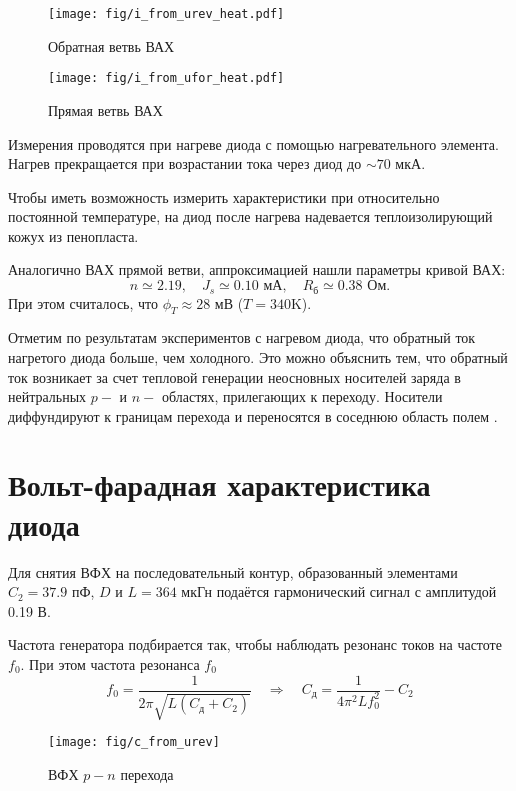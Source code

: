 \documentclass[a4paper,14pt]{extarticle}
\begin{document}
\begin{figure}[H]
	\centering
	\texttt{[image: fig/i\_from\_urev\_heat.pdf]}
	\vspace{-1em}
	\caption{Обратная ветвь ВАХ}
	\label{fig:vax2obr}
\end{figure}
\begin{figure}[H]
	\centering
	\texttt{[image: fig/i\_from\_ufor\_heat.pdf]}
	\vspace{-1em}
	\caption{Прямая ветвь ВАХ}
	\label{fig:vax2}
\end{figure}
Измерения проводятся при нагреве диода с помощью нагревательного элемента. Нагрев прекращается при возрастании тока через диод до $\sim70$ мкА. 

Чтобы иметь возможность измерить характеристики при относительно постоянной температуре, на диод после нагрева надевается теплоизолирующий кожух из пенопласта.

Аналогично ВАХ прямой ветви, аппроксимацией нашли параметры кривой ВАХ:
\begin{equation}
    n \simeq 2.19,\quad J_s \simeq 0.10  \text{ мА},\quad R_{\text{б}} \simeq 0.38 \text{ Ом}.
\end{equation}
При этом считалось, что $\phi_T\approx28$ мВ ($T=340$K).


Отметим по результатам экспериментов с нагревом диода, что обратный ток нагретого диода больше, чем холодного. Это можно объяснить тем, что обратный ток возникает за счет тепловой генерации неосновных носителей заряда в нейтральных $p-$ и $n-$ областях, прилегающих к переходу. Носители диффундируют к границам перехода и переносятся в соседнюю область полем \cite[стр.14]{met}.



\newpage
\section{Вольт-фарадная характеристика диода}

Для снятия ВФХ на последовательный контур, образованный элементами $C_2=37.9$ пФ, $D$ и $L= 364$ мкГн подаётся гармонический сигнал с амплитудой 0.19 В.

Частота генератора подбирается так, чтобы наблюдать резонанс токов на частоте $f_0$. При этом частота резонанса $f_0$
\begin{equation}
	f_0 = \frac{1}{2 \pi \sqrt{L(C_{\text{д}} + C_2)}}
	\quad\Rightarrow\quad
	C_{\text{д}} = \frac{1}{4 \pi^2 L f_0^2} - C_2
	\label{eq:cd}
\end{equation}
\begin{figure}[H]
	\centering
	\texttt{[image: fig/c\_from\_urev]}
	\vspace{-1em}
	\caption{ВФХ $p-n$ перехода}
	\label{fig:cax}
\end{figure}
\end{document}
